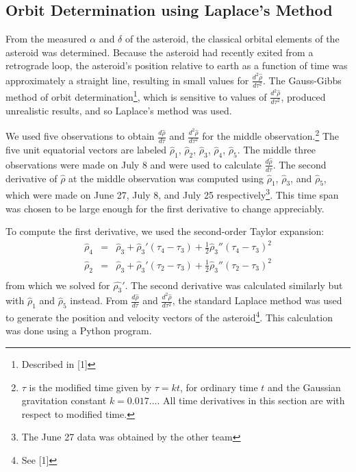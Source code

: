\documentclass[12pt,journal,compsoc]{IEEEtran}
\begin{document}
\subsection{Orbit Determination using Laplace's Method}
From the measured $\alpha$ and $\delta$ of the asteroid, the classical orbital elements of the asteroid was determined. 
Because the asteroid had recently exited from a retrograde loop,
the asteroid's position relative to earth as a function of time was approximately a straight line,
resulting in small values for $\frac{d^2\hat{\rho}}{d\tau^2}$. 
The Gauss-Gibbs method of orbit determination\footnote{Described in [1]}, which is
sensitive to values of $\frac{d^2\hat{\rho}}{d\tau^2}$, produced unrealistic results, and so Laplace's method was used.

We used five observations to obtain $\frac{d\hat{\rho}}{d\tau}$ and $\frac{d^2\hat{\rho}}{d\tau^2}$ for the middle observation.\footnote{$\tau$ is the modified time given by $\tau=kt$, for ordinary time $t$ and the Gaussian gravitation constant $k=0.017...$.
All time derivatives in this section are with respect to modified time.}
The five unit equatorial vectors are labeled $\hat{\rho}_1$, $\hat{\rho}_2$, $\hat{\rho}_3$, $\hat{\rho}_4$, $\hat{\rho}_5$. The middle three observations were made on July 8 and were used to calculate $\frac{d\hat{\rho}}{d\tau}$.
The second derivative of $\hat{\rho}$ at the middle observation was computed using $\hat{\rho}_1$, $\hat{\rho}_3$, and $\hat{\rho}_5$, which were made on June 27, July 8, and July 25 respectively\footnote{The June 27 data was obtained by the other team}.
This time span was chosen to be large enough for the first derivative to change appreciably.


To compute the first derivative, we used the second-order Taylor expansion:
\begin{eqnarray*}
\hat{\rho}_4&=&\hat{\rho}_3+\hat{\rho}_3' (\tau_4-\tau_3)+\frac{1}{2}\hat{\rho}_3'' (\tau_4-\tau_3)^2\\
\hat{\rho}_2&=&\hat{\rho}_3+\hat{\rho}_3' (\tau_2-\tau_3)+\frac{1}{2}\hat{\rho}_3'' (\tau_2-\tau_3) ^2\\
\end{eqnarray*}
from which we solved for $\hat{\rho_3}'$.
The second derivative was calculated similarly but with $\hat{\rho}_1$ and $\hat{\rho}_5$ instead.
From $\frac{d\hat{\rho}}{d\tau}$ and $\frac{d^2\hat{\rho}}{d\tau^2}$, the standard Laplace method was used to generate the position and velocity vectors of the asteroid\footnote{See [1]}.
This calculation was done using a Python program.
\end{document}
